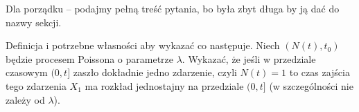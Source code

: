 Dla porządku -- podajmy pełną treść pytania, bo była zbyt długa by ją dać do nazwy sekcji.

\begin{question}
 Definicja i potrzebne własności aby wykazać co następuje. Niech \((N(t),t_0)\) będzie procesem Poissona o parametrze \(\lambda\). Wykazać, że jeśli w przedziale czasowym \((0,t]\) zaszło dokładnie jedno zdarzenie, czyli \(N(t) = 1\) to czas zajścia tego zdarzenia \(X_1\) ma rozkład jednostajny na przedziale \((0,t]\) (w szczególności nie zależy od \(\lambda\)).
\end{question}